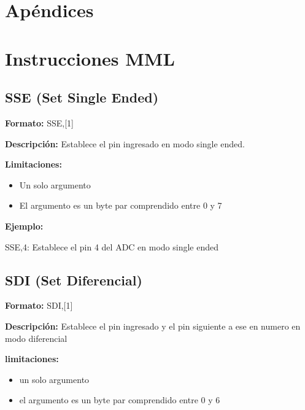 \documentclass{article}
\theoremstyle{definition}
\theoremstyle{remark}
\begin{document}
\clearpage


\section{Apéndices} %
\label{sec:apendices}


\appendix
\section{Instrucciones MML} %
\label{sec:instrucciones_mml}


\subsection{SSE (Set Single Ended)} %
\label{sub:sse_set_single_ended}


\textbf{Formato:} SSE,[1]

\textbf{Descripción:}
Establece el pin ingresado en modo single ended.

\textbf{Limitaciones:}
\begin{itemize}
  \item Un solo argumento
  \item El argumento es un byte par comprendido entre 0 y 7
\end{itemize}

\textbf{Ejemplo:}

SSE,4: Establece el pin 4 del ADC en modo single ended


\subsection{SDI (Set Diferencial)} %
\label{sub:sdi_set_diferencial}


\textbf{Formato:} SDI,[1]

\textbf{Descripción:}
Establece el pin ingresado y el pin siguiente a ese en numero en modo diferencial

\textbf{limitaciones:}
\begin{itemize}
  \item un solo argumento
  \item el argumento es un byte par comprendido entre 0 y 6
\end{itemize}
\end{document}
